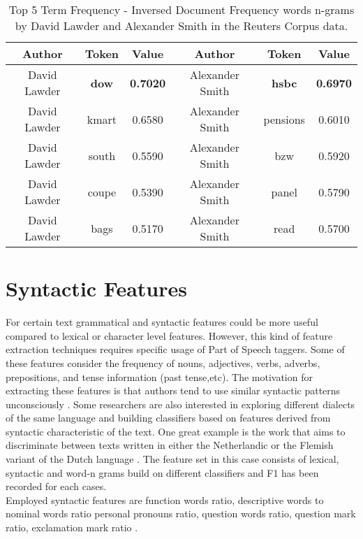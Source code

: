 \begin{table}[h!]
	\begin{center}  
		\caption[Top 5 Term Frequency - Inversed Document Frequency n-grams in Reuters corpus]{Top 5 Term Frequency - Inversed Document Frequency words n-grams by David Lawder and Alexander Smith in the Reuters Corpus data.} 
		\label{tab:tableTFIDFRCV1}
		\begin{tabular}{|c | c | c || c | c | c |}
			\hline 
			Author & Token & Value & Author & Token & Value \\
			\hline \hline
			David Lawder & \textbf{dow} & \textbf{0.7020} & Alexander Smith & \textbf{hsbc} & \textbf{0.6970} \\ \hline
			David Lawder & kmart & 0.6580	& Alexander Smith & pensions & 0.6010  \\ \hline
			David Lawder & south & 0.5590	& Alexander Smith & bzw & 0.5920 \\ \hline
			David Lawder & coupe & 0.5390 & Alexander Smith & panel & 0.5790 \\ \hline
			David Lawder & bags & 0.5170 & Alexander Smith & read & 0.5700 \\ \hline
		\end{tabular} 
	\end{center}
\end{table}


\section{Syntactic Features}

For certain text grammatical and syntactic features could be more useful compared to lexical or character level features. However, this kind of feature extraction techniques requires specific usage of Part of Speech taggers. Some of these features consider the frequency of nouns, adjectives, verbs, adverbs, prepositions, and tense information (past tense,etc). The motivation for extracting these features is that authors tend to use similar syntactic patterns unconsciously \cite{stamatatos2009survey}.
Some researchers are also interested in exploring different dialects of the same language and building classifiers based on features derived from syntactic characteristic of the text. One great example is the work that aims to discriminate between texts written in either the Netherlandic or the Flemish variant of the Dutch language \cite{van2017exploring}.
The feature set in this case consists of lexical, syntactic and word-n grams build on different classifiers and F1 has been recorded for each cases.\\
Employed syntactic features are function words ratio, descriptive words to nominal words ratio personal pronouns ratio, question words ratio, question mark ratio, exclamation
mark ratio \cite{van2017exploring}.

